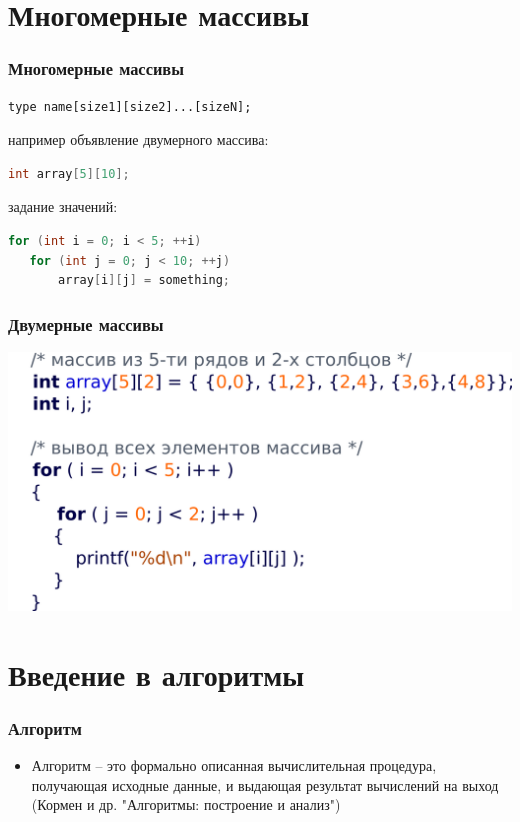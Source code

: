 \documentclass[12pt,pdf,hyperref={unicode}]{beamer}
\begin{document}
\section{Многомерные массивы}

\begin{frame}[fragile]
\frametitle{Многомерные массивы} 
\begin{verbatim}
type name[size1][size2]...[sizeN];
\end{verbatim}
например объявление двумерного массива:
\begin{lstlisting}[language=C++,basicstyle=\ttfamily,keywordstyle=\color{blue}]
int array[5][10];
\end{lstlisting}
задание значений:
\begin{lstlisting}[language=C++,basicstyle=\ttfamily,keywordstyle=\color{blue}, showtabs]
for (int i = 0; i < 5; ++i)
   for (int j = 0; j < 10; ++j)
       array[i][j] = something;
\end{lstlisting}
\end{frame}

\begin{frame}[fragile]
\frametitle{Двумерные массивы} 
\begin{center}
\includegraphics[scale=0.95]{images/twodim_array.png}
\end{center}
\end{frame}



\section{Введение в алгоритмы}

\begin{frame}[fragile]
\frametitle{Алгоритм} 
\begin{itemize}
\item Алгоритм -- это формально описанная вычислительная процедура, получающая исходные данные, и выдающая результат
вычислений на выход \\
(Кормен и др. "Алгоритмы: построение и анализ")
\end{itemize}
\end{frame}
\end{document}

